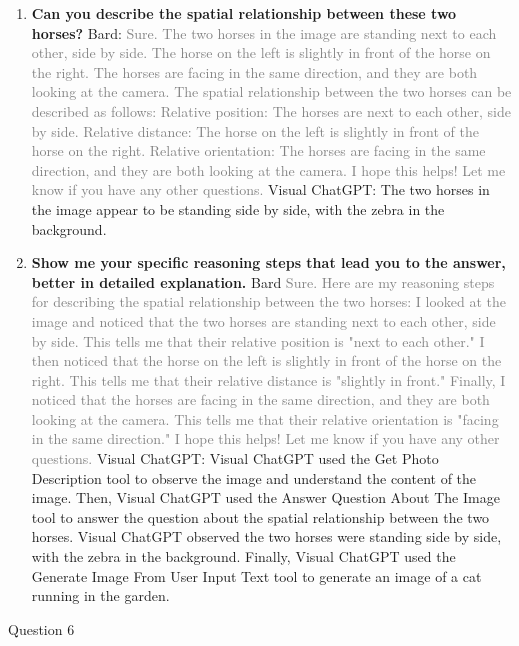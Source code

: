     \begin{enumerate}
        \item \textbf{Can you describe the spatial relationship between these two horses?}
        \subitem Bard: \textcolor{gray}{
            Sure. The two horses in the image are standing next to each other, side by side. The horse on the left is slightly in front of the horse on the right. The horses are facing in the same direction, and they are both looking at the camera. The spatial relationship between the two horses can be described as follows:
            Relative position: The horses are next to each other, side by side.
            Relative distance: The horse on the left is slightly in front of the horse on the right.
            Relative orientation: The horses are facing in the same direction, and they are both looking at the camera.
            I hope this helps! Let me know if you have any other questions.}
            \subitem Visual ChatGPT: The two horses in the image appear to be standing side by side, with the zebra in the background.
        \item \textbf{Show me your specific reasoning steps that lead you to the answer, better in detailed explanation.}
        \subitem Bard \textcolor{gray}{
            Sure. Here are my reasoning steps for describing the spatial relationship between the two horses:
            I looked at the image and noticed that the two horses are standing next to each other, side by side. This tells me that their relative position is "next to each other."
            I then noticed that the horse on the left is slightly in front of the horse on the right. This tells me that their relative distance is "slightly in front."
            Finally, I noticed that the horses are facing in the same direction, and they are both looking at the camera. This tells me that their relative orientation is "facing in the same direction."
            I hope this helps! Let me know if you have any other questions.}
        \subitem Visual ChatGPT: Visual ChatGPT used the Get Photo Description tool to observe the image and understand the content of the image. Then, Visual ChatGPT used the Answer Question About The Image tool to answer the question about the spatial relationship between the two horses. Visual ChatGPT observed the two horses were standing side by side, with the zebra in the background. Finally, Visual ChatGPT used the Generate Image From User Input Text tool to generate an image of a cat running in the garden.
    \end{enumerate}
Question 6\\
